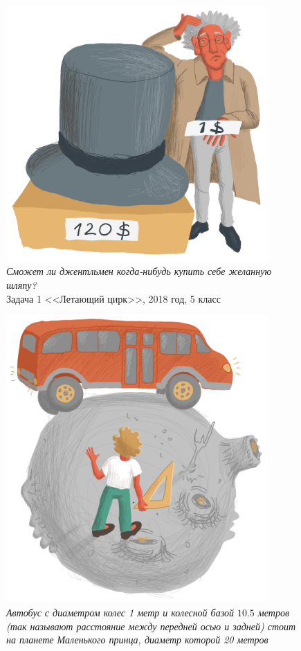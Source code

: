 \documentclass[10pt]{scrbook} \usepackage{modules/nonstahp_book}
\begin{document}
\begin{figure} \begin{center}
	\includegraphics[width=10cm]{figures/color/13c.jpg}
	\vspace{1cm}
	\caption{
             {\itshape  Сможет ли джентльмен когда-нибудь купить себе желанную шляпу? }\medskip\\
             {Задача 1 <<Летающий цирк>>, 2018 год, 5 класс}}
\end{center} \end{figure}

\begin{figure} \begin{center}
	\includegraphics[width=10cm]{figures/color/14c.jpg}
	\vspace{1cm}
	\caption{
             {\itshape  Автобус с диаметром колес 1 метр и колесной базой $10.5$ метров 
             (так называют расстояние между передней осью и задней) стоит на планете Маленького 
             принца, диаметр которой 20 метров }\\
             }
\end{center} \end{figure}
\end{document}
